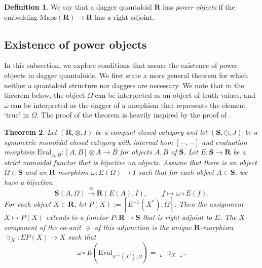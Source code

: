 \documentclass[12pt]{tac}
\newtheorem{theorem}{Theorem}[section]
\theoremstyle{definition}
\newtheorem{definition}[theorem]{Definition}
\theoremstyle{remark}
\newcommand{\<}{\langle}
\renewcommand{\>}{\rangle}
\renewcommand{\:}{\colon}
\newcommand{\Eval}{\mathrm{Eval}}
\newcommand{\coname}[1]{\llcorner #1\lrcorner}
\begin{document}
\begin{definition}
We say that a dagger quantaloid  $\mathbf R$ has \emph{power objects} if the embedding $\mathrm{Maps}(\mathbf R)\to\mathbf R$ has a right adjoint.
\end{definition}

\subsection{Existence of power objects}
In this subsection, we explore conditions that assure the existence of power objects in dagger quantaloids. We first state a more general theorem for which neither a quantaloid structure nor daggers are necessary. We note that in the theorem below, the object $\Omega$ can be interpreted as an object of truth values, and $\omega$ can be interpreted as the dagger of a morphism that represents the element `true' in $\Omega$. The proof of the theorem is heavily inspired by the proof of \cite[Theorem 9.2]{klm-quantumposets}.

\begin{theorem}\label{thm:existence power objects}
    Let $(\mathbf R,\otimes,I)$ be a compact-closed category and let $(\mathbf S,\odot,J)$ be a symmetric monoidal closed category with internal hom $[-,-]$ and evaluation morphism $\Eval_{A,B}:[A,B]\otimes A\to B$ for objects $A,B$ of $\mathbf S$.  Let $E:\mathbf S\to\mathbf R$ be a strict monoidal functor that is bijective on objects. Assume that there is an object $\Omega\in\mathbf S$ and an $\mathbf R$-morphism $\omega:E(\Omega)\to I$ such that for each object $A\in\mathbf S$, we have a bijection
    \begin{equation}\label{eq:assumption-bijection}
\mathbf S(A,\Omega)\xrightarrow{\cong}\mathbf R(E(A),I), \qquad f\mapsto \omega\circ E(f).
\end{equation}
For each object $X\in\mathbf R$, let $P(X):= [E^{-1}(X^*),\Omega]$. Then the assignment $X\mapsto P(X)$ extends to a functor $P:\mathbf R\to\mathbf S$ that is right adjoint to $E$. 
The $X$-component of the co-unit $\ni$ of this adjunction is the unique $\mathbf R$-morphism $\ni_X:EP(X)\to X$ such that
\begin{equation}\label{eq:defni}
    \omega\circ E(\Eval_{E^{-1}(X^*),\Omega})=\coname{\ni_X}.
\end{equation}
\end{theorem}
\end{document}
